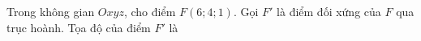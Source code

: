\begin{ex}
Trong không gian $Oxyz$, cho điểm $F(6;4;1)$. Gọi $F'$ là điểm đối xứng của $F$ qua trục hoành. Tọa độ của điểm $F'$ là
\end{ex}
